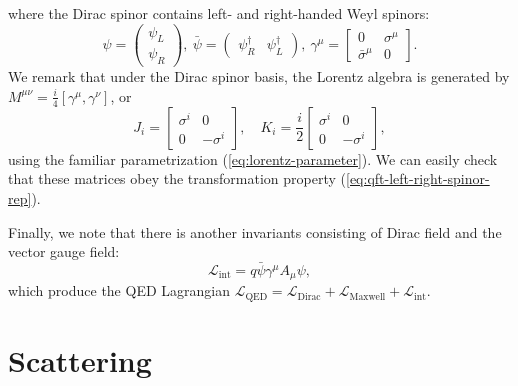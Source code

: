 \documentclass[aps,prb,superscriptaddress,nofootinbib]{revtex4}
\begin{document}
where the Dirac spinor contains left- and right-handed Weyl spinors:
\begin{equation*}
	\psi = \begin{pmatrix}
		\psi_L \\ \psi_R
	\end{pmatrix},\ 
	\bar\psi = \begin{pmatrix}
		\psi_R^\dagger & \psi_L^\dagger
	\end{pmatrix},\ 
	\gamma^\mu = \begin{bmatrix}
		0 & \sigma^\mu \\
		\bar\sigma^\mu & 0
	\end{bmatrix}.
\end{equation*}
We remark that under the Dirac spinor basis, the Lorentz algebra is generated by $M^{\mu\nu} = \frac{i}{4}[\gamma^\mu, \gamma^\nu]$, or 
\begin{equation*}
	J_i = \begin{bmatrix}
		\sigma^i & 0 \\ 0 & -\sigma^i
	\end{bmatrix}, \quad 
	K_i = \frac{i}{2}\begin{bmatrix}
		\sigma^i & 0 \\ 0 & -\sigma^i
	\end{bmatrix},
\end{equation*}
using the familiar parametrization (\ref{eq:lorentz-parameter}).
We can easily check that these matrices obey the transformation property (\ref{eq:qft-left-right-spinor-rep}).

Finally, we note that there is another invariants consisting of Dirac field and the vector gauge field:
\begin{equation}
	\mathcal L_\text{int} = q \bar\psi \gamma^\mu A_\mu \psi,
\end{equation}
which produce the QED Lagrangian $\mathcal{L}_\text{QED} = \mathcal{L}_\text{Dirac} + \mathcal{L}_\text{Maxwell}+\mathcal{L}_\text{int}$.








\section{Scattering}
\end{document}
